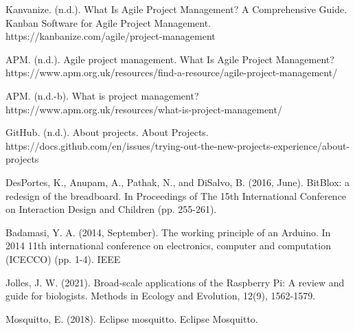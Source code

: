 \documentclass[12pt]{article}
\begin{document}
\begin{thebibliography}{9}
Kanvanize. (n.d.). What Is Agile Project Management? A Comprehensive Guide. Kanban Software for Agile Project Management. https://kanbanize.com/agile/project-management

APM. (n.d.). Agile project management. What Is Agile Project Management? https://www.apm.org.uk/resources/find-a-resource/agile-project-management/

APM. (n.d.-b). What is project management? https://www.apm.org.uk/resources/what-is-project-management/

GitHub. (n.d.). About projects. About Projects. https://docs.github.com/en/issues/trying-out-the-new-projects-experience/about-projects

DesPortes, K., Anupam, A., Pathak, N., and DiSalvo, B. (2016, June). BitBlox: a redesign of the breadboard. In Proceedings of The 15th International Conference on Interaction Design and Children (pp. 255-261). 

Badamasi, Y. A. (2014, September). The working principle of an Arduino. In 2014 11th international conference on electronics, computer and computation (ICECCO) (pp. 1-4). IEEE


Jolles, J. W. (2021). Broad‐scale applications of the Raspberry Pi: A review and guide for biologists. Methods in Ecology and Evolution, 12(9), 1562-1579.


Mosquitto, E. (2018). Eclipse mosquitto. Eclipse Mosquitto. 


\end{thebibliography}
\end{document}
